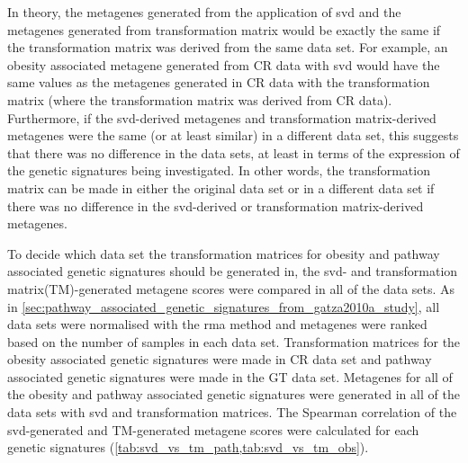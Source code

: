 In theory, the metagenes generated from the application of \gls{svd} and the metagenes generated from transformation matrix would be exactly the same if the transformation matrix was derived from the same data set.
For example, an obesity associated metagene generated from CR data with \gls{svd} would have the same values as the metagenes generated in CR data with the transformation matrix (where the transformation matrix was derived from CR data).
Furthermore, if the \gls{svd}-derived metagenes and transformation matrix-derived metagenes were the same (or at least similar) in a different data set, this suggests that there was no difference in the data sets, at least in terms of the expression of the genetic signatures being investigated.
In other words, the transformation matrix can be made in either the original data set or in a different data set if there was no difference in the \gls{svd}-derived or transformation matrix-derived metagenes.

To decide which data set the transformation matrices for obesity and pathway associated genetic signatures should be generated in, the \gls{svd}- and transformation matrix(TM)-generated metagene scores were compared in all of the data sets.
As in \cref{sec:pathway_associated_genetic_signatures_from_gatza2010a_study}, all data sets were normalised with the \gls{rma} method and metagenes were ranked based on the number of samples in each data set.
Transformation matrices for the obesity associated genetic signatures were made in CR data set and pathway associated genetic signatures were made in the GT data set.
Metagenes for all of the obesity and pathway associated genetic signatures were generated in all of the data sets with \gls{svd} and transformation matrices.
The Spearman correlation of the \gls{svd}-generated and TM-generated metagene scores were calculated for each genetic signatures (\cref{tab:svd_vs_tm_path,tab:svd_vs_tm_obs}).

